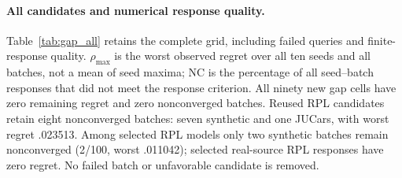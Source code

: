 \documentclass[11pt]{article}
\begin{document}
\paragraph{All candidates and numerical response quality.}
Table~\ref{tab:gap_all} retains the complete grid, including failed queries
and finite-response quality. $\rho_{\max}$ is the worst observed regret over
all ten seeds and all batches, not a mean of seed maxima; NC is the percentage
of all seed--batch responses that did not meet the response criterion.
All ninety new gap cells have zero remaining regret and zero nonconverged
batches. Reused RPL candidates retain eight nonconverged batches: seven
synthetic and one JUCars, with worst regret .023513. Among selected RPL
models only two synthetic batches remain nonconverged (2/100, worst .011042);
selected real-source RPL responses have zero regret. No failed batch or
unfavorable candidate is removed.
\end{document}
